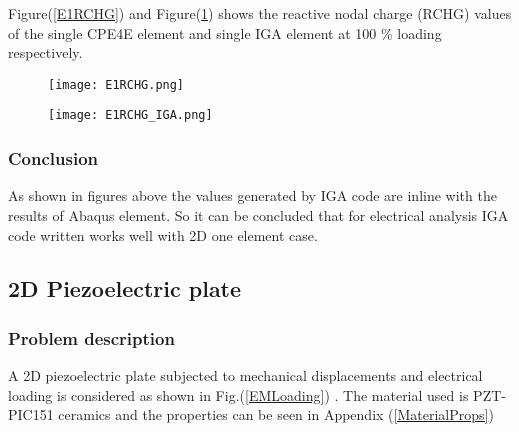 \documentclass[11pt]{article}
\begin{document}
Figure(\ref{E1RCHG}) and Figure(\ref{E1RCHG_IGA}) shows the reactive nodal charge (RCHG) values of the single CPE4E element and single IGA element at 100 \% loading respectively. \\
\begin{figure}[H]
	\centering
	\begin{minipage}{.5\textwidth}
		\centering
		\texttt{[image: E1RCHG.png]}
		\label{E1RCHG}
	\end{minipage}%
	\begin{minipage}{.5\textwidth}
		\centering
		\texttt{[image: E1RCHG\_IGA.png]}
		\label{E1RCHG_IGA}
	\end{minipage}
\end{figure}

\subsubsection{Conclusion}
As shown in figures above the values generated by IGA code are inline with the results of Abaqus element. So it can be concluded that for electrical analysis IGA code written works well with 2D one element case.



\subsection{2D Piezoelectric plate}
\subsubsection{Problem description}
A 2D piezoelectric plate subjected to mechanical displacements and electrical
loading is considered as shown in Fig.(\ref{EMLoading}) . The material used is PZT-PIC151 ceramics and the properties can be seen in Appendix (\ref{MaterialProps})
\end{document}
